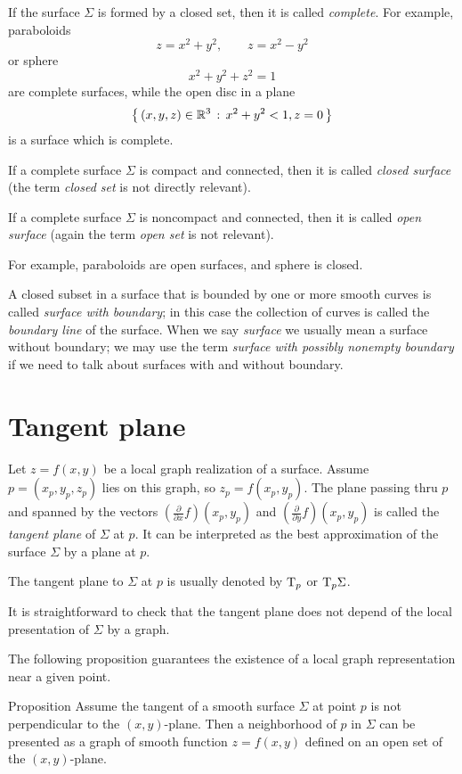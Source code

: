 If the surface $\Sigma$ is formed by a closed set, then it is called \emph{complete}.
For example, paraboloids 
\[z=x^2+y^2,\quad\quad z=x^2-y^2\]
or sphere 
\[x^2+y^2+z^2=1\]
are complete surfaces, while the
open disc in a plane 
\[\left\{\,{(x,y,z)\in\mathbb{R}^3}\,:\,{x^2+y^2<1, z=0}\,\right\}\]
is a surface which is complete.


If a complete surface $\Sigma$ is compact and connected, then it is called \emph{closed surface} (the term \emph{closed set} is not directly relevant).

If a complete surface $\Sigma$ is noncompact and connected, then it is called  \emph{open surface} (again the term \emph{open set} is not relevant).

For example, paraboloids 
are open surfaces, 
and sphere is closed.

A closed subset in a surface that is bounded by one or more smooth %
curves is called \emph{surface with boundary}; in this case the collection of curves is called the \emph{boundary line} of the surface.
When we say \emph{surface} we usually mean a surface without boundary;
we may use the term \emph{surface with possibly nonempty boundary} if we need to talk about surfaces with and without boundary.



\section{Tangent plane}

Let $z=f(x,y)$ be a local graph realization of a surface. 
Assume $p=(x_p,y_p,z_p)$ lies on this graph, so $z_p=f(x_p,y_p)$.
The plane passing thru $p$ and spanned by the vectors $(\tfrac{\partial}{\partial x}f)(x_p,y_p)$ and  $(\tfrac{\partial}{\partial y}f)(x_p,y_p)$ is called the \emph{tangent plane} of $\Sigma$ at $p$.
It can be interpreted as the best approximation of the surface $\Sigma$ by a plane at $p$.

The tangent plane to $\Sigma$ at $p$ is usually denoted by $\mathrm{T}_p$ or $\mathrm{T}_p\Sigma$.

It is straightforward to check that the tangent plane does not depend of the local presentation of $\Sigma$ by a graph.

The following proposition guarantees the existence of a local graph representation near a given point.

\begin{thm}{Proposition}\label{prop:perp}
Assume the tangent of a smooth surface $\Sigma$ at point $p$ is not perpendicular to the $(x,y)$-plane.
Then a neighborhood of $p$ in $\Sigma$ can be presented as a graph of smooth function $z=f(x,y)$ defined on an open set of the $(x,y)$-plane.
\end{thm}

